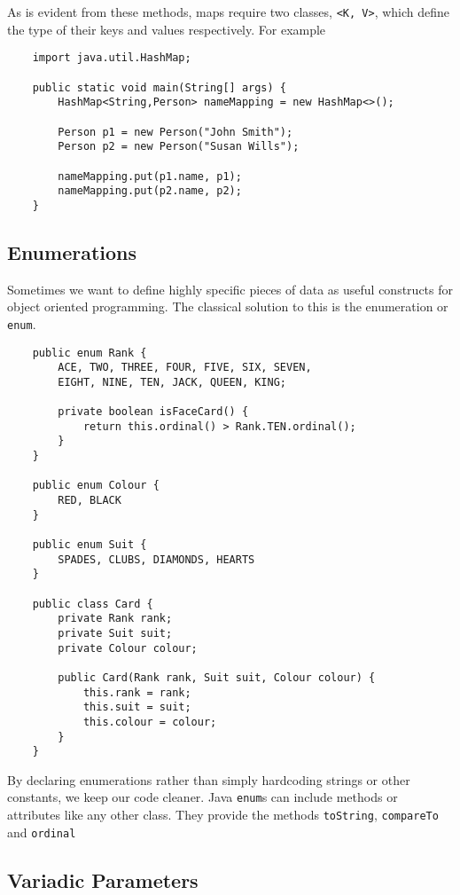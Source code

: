 \documentclass[12pt]{report}
\newcommand{\code}[1]{\lstinline{#1}}
\begin{document}
\begin{flushleft}
As is evident from these methods, maps require two classes, \code{<K, V>},
which define the type of their keys and values respectively. For example

\begin{lstlisting}
    import java.util.HashMap;

    public static void main(String[] args) {
        HashMap<String,Person> nameMapping = new HashMap<>();

        Person p1 = new Person("John Smith");
        Person p2 = new Person("Susan Wills");

        nameMapping.put(p1.name, p1);
        nameMapping.put(p2.name, p2);
    }
\end{lstlisting}

\subsection*{Enumerations}

Sometimes we want to define highly specific pieces of data as useful constructs
for object oriented programming. The classical solution to this is the
enumeration or \code{enum}.

\begin{lstlisting}
    public enum Rank {
        ACE, TWO, THREE, FOUR, FIVE, SIX, SEVEN,
        EIGHT, NINE, TEN, JACK, QUEEN, KING;

        private boolean isFaceCard() {
            return this.ordinal() > Rank.TEN.ordinal();
        }
    }

    public enum Colour {
        RED, BLACK
    }

    public enum Suit {
        SPADES, CLUBS, DIAMONDS, HEARTS
    }

    public class Card {
        private Rank rank;
        private Suit suit;
        private Colour colour;

        public Card(Rank rank, Suit suit, Colour colour) {
            this.rank = rank;
            this.suit = suit;
            this.colour = colour;
        }
    }
\end{lstlisting}

By declaring enumerations rather than simply hardcoding strings or other
constants, we keep our code cleaner. Java \code{enum}s can include methods
or attributes like any other class. They provide the methods \code{toString},
\code{compareTo} and \code{ordinal}

\subsection*{Variadic Parameters}


\end{flushleft}
\end{document}
